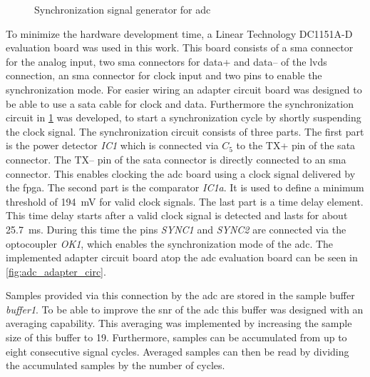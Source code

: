 \documentclass[12pt,a4paper,parskip=full,abstract=true,BCOR=12mm,twoside,open=right]{scrreprt}
\makeatletter
\newcommand\currentcoordinate{\the\tikz@lastxsaved,\the\tikz@lastysaved}
\def\device#1{\mbox{\textit{#1}}}
\makeatother
\begin{document}
\begin{figure}[htb]
{
    }
    \caption{Synchronization signal generator for \gls{adc}}
    \label{fig:adc_adapter}
\end{figure}

To minimize the hardware development time, a Linear Technology DC1151A-D evaluation board was used
in this work. This board consists of a \gls{sma} connector for the analog input, two \gls{sma}
connectors for data+ and data-- of the \gls{lvds} connection, an \gls{sma} connector for clock input
and two pins to enable the synchronization mode. For easier wiring an adapter circuit
board was designed to be able to use a \gls{sata} cable for clock and data. Furthermore the synchronization
circuit in \cref{fig:adc_adapter} was developed, to start a synchronization cycle by shortly suspending the clock
signal. The synchronization circuit consists of three parts. The first part is the power detector \device{IC1}
which is connected via \device{$C_5$} to the TX+ pin of the \gls{sata} connector. The TX-- pin of the
\gls{sata} connector is directly connected to an \gls{sma} connector.
This enables clocking the \gls{adc} board using a clock signal delivered by the \gls{fpga}. The second part
is the comparator \device{IC1a}. It is used to define a minimum threshold of \SI{194}{\milli\volt}
for valid clock signals. The last part is a time delay element. This time delay starts after a valid clock
signal is detected and lasts for about \SI{25.7}{\milli\second}. During
this time the pins \device{SYNC1} and \device{SYNC2} are connected via the optocoupler \device{OK1}, which
enables the synchronization mode of the \gls{adc}. The implemented adapter circuit board atop the
\gls{adc} evaluation board can be seen in \cref{fig:adc_adapter_circ}.

Samples provided via this connection by the \gls{adc} are stored in the sample buffer
\device{buffer1}. To be able to improve the \gls{snr} of the \gls{adc} this buffer
was designed with an averaging capability\cite{ad_mt004}. This averaging was implemented by increasing
the sample size of this buffer to \SI{19}{\bit}. Furthermore, samples can be accumulated
from up to eight consecutive signal cycles. Averaged samples can then be read by dividing the
accumulated samples by the number of cycles.
\end{document}
